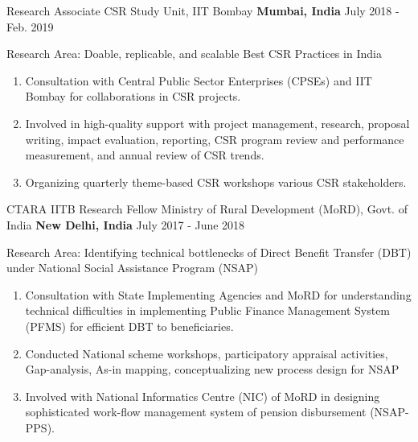 


\begin{cventries}

\cventry
{Research Associate} %
{CSR Study Unit, IIT Bombay} %
{\textbf{Mumbai, India}} %
{July 2018 - Feb. 2019} %
{ %
\begin{cvitems}
\item {Research Area: Doable, replicable, and scalable Best CSR Practices in India}
\begin{enumerate}
\item {Consultation with Central Public Sector Enterprises (CPSEs) and IIT Bombay for collaborations in CSR projects.}
\item {Involved in high-quality support with project management, research, proposal writing, impact evaluation, reporting, CSR program review and performance measurement, and annual review of CSR trends.}
\item {Organizing quarterly theme-based CSR workshops various CSR stakeholders.}
\end{enumerate}
\end{cvitems}
}
\cventry
{CTARA IITB Research Fellow} %
{Ministry of Rural Development (MoRD), Govt. of India} %
{\textbf{New Delhi, India}} %
{July 2017 - June 2018} %
{ %
\begin{cvitems}
\item {Research Area: Identifying technical bottlenecks of Direct Benefit Transfer (DBT) under National Social Assistance Program (NSAP)}
\begin{enumerate}
\item {Consultation with State Implementing Agencies and MoRD for understanding technical difficulties in implementing Public Finance Management System (PFMS) for efficient DBT to beneficiaries.}
\item {Conducted National scheme workshops, participatory appraisal activities, Gap-analysis, As-in mapping, conceptualizing new process design for NSAP}
\item {Involved with National Informatics Centre (NIC) of MoRD in designing sophisticated work-flow management system of pension disbursement (NSAP-PPS).}
\end{enumerate}
\end{cvitems}
}
\end{cventries}